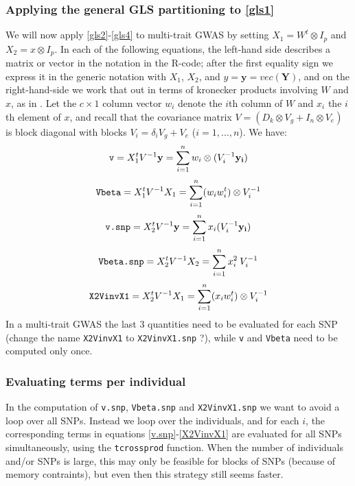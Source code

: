 \documentclass[12pt]{article}
\begin{document}
\subsubsection{Applying the general GLS partitioning to \eqref{gls1}}

We will now apply \eqref{gls2}-\eqref{gls4} to multi-trait GWAS by setting $X_1 = W^t \otimes I_p$ and $X_2 = x \otimes I_p$. In each of the following equations, the left-hand side describes a matrix or vector in the notation in the R-code; after the first equality sign we express it in the generic notation with $X_1$, $X_2$, and $y = \mathbf{y} = vec(\mathbf{Y})$, and on the right-hand-side we work that out in terms of kronecker products involving $W$ and $x$, as in \cite{zhou_stephens_2014}. Let the $c \times 1$ column vector $w_i$ denote the $i$th column of $W$ and $x_i$ the $i$th element of $x$, and 
recall that the covariance matrix $V = (D_k \otimes V_g  + I_n \otimes V_e)$ is block diagonal with blocks
$V_i = \delta_i V_g + V_e$ ($i = 1,\ldots,n$). We have:
%
\begin{equation} \label{v}
\verb|v| = X_1^t V^{-1} \mathbf{y} = 
\sum_{i=1}^n w_i  \otimes (V_i^{-1} \mathbf{y_i})
\end{equation}
%
\begin{equation} \label{Vbeta}
\verb|Vbeta| = X_1^t V^{-1} X_1 = \sum_{i=1}^n (w_i w_i^t)  \otimes V_i^{-1}
\end{equation}
%
\begin{equation} \label{v.snp}
\verb|v.snp| = X_2^t V^{-1} \mathbf{y} = \sum_{i=1}^n x_i (V_i^{-1} \mathbf{y_i})
\end{equation}
%
\begin{equation} \label{Vbeta.snp}
\verb|Vbeta.snp| = X_2^t V^{-1} X_2 = \sum_{i=1}^n x_i^2 \: V_i^{-1}
\end{equation}
%
\begin{equation} \label{X2VinvX1}
\verb|X2VinvX1| = X_2^t V^{-1} X_1 = \sum_{i=1}^n (x_i w_i^t)  \otimes V_i^{-1} 
\end{equation}
%
In a multi-trait GWAS the last 3 quantities need to be evaluated for each SNP (change the name \verb|X2VinvX1| to \verb|X2VinvX1.snp| ?), while \verb|v| and \verb|Vbeta| need to be computed only once.

\subsubsection{Evaluating terms per individual}

In the computation of \verb|v.snp|, \verb|Vbeta.snp| and \verb|X2VinvX1.snp| we want to avoid a loop over all SNPs. Instead we loop over the individuals, and for each $i$, the corresponding terms in equations \eqref{v.snp}-\eqref{X2VinvX1} are evaluated for all SNPs simultaneously, using the \verb|tcrossprod| function. When the number of individuals and/or SNPs is large, this may only be feasible for blocks of SNPs (because of memory contraints), but even then this strategy still seems faster.
\end{document}
